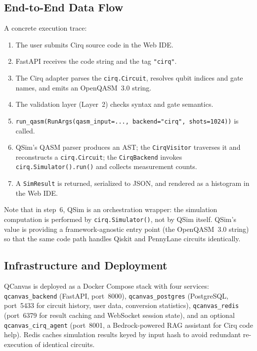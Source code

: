 \documentclass[runningheads]{llncs}
\begin{document}
\subsection{End-to-End Data Flow}

A concrete execution trace:
\begin{enumerate}
    \item The user submits Cirq source code in the Web IDE.
    \item FastAPI receives the code string and the tag \texttt{"cirq"}.
    \item The Cirq adapter parses the \texttt{cirq.Circuit}, resolves qubit indices and gate names, and emits an OpenQASM~3.0 string.
    \item The validation layer (Layer~2) checks syntax and gate semantics.
    \item \texttt{run\_qasm(RunArgs(qasm\_input=..., backend="cirq", shots=1024))} is called.
    \item QSim's QASM parser produces an AST; the \texttt{CirqVisitor} traverses it and reconstructs a \texttt{cirq.Circuit}; the \texttt{CirqBackend} invokes \texttt{cirq.Simulator().run()} and collects measurement counts.
    \item A \texttt{SimResult} is returned, serialized to JSON, and rendered as a histogram in the Web IDE.
\end{enumerate}
Note that in step~6, QSim is an orchestration wrapper: the simulation computation is performed by \texttt{cirq.Simulator()}, not by QSim itself. QSim's value is providing a framework-agnostic entry point (the OpenQASM~3.0 string) so that the same code path handles Qiskit and PennyLane circuits identically.

\subsection{Infrastructure and Deployment}

QCanvas is deployed as a Docker Compose stack with four services: \texttt{qcanvas\_backend} (FastAPI, port~8000), \texttt{qcanvas\_postgres} (PostgreSQL, port~5433 for circuit history, user data, conversion statistics), \texttt{qcanvas\_redis} (port~6379 for result caching and WebSocket session state), and an optional \texttt{qcanvas\_cirq\_agent} (port~8001, a Bedrock-powered RAG assistant for Cirq code help). Redis caches simulation results keyed by input hash to avoid redundant re-execution of identical circuits.

\end{document}

